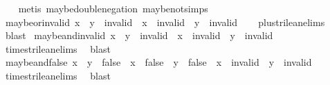 \begin{isabellebody}
%
\isadelimproof
\ \ %
\endisadelimproof
%
\isatagproof
{}\isamarkupfalse%
\ {\isacharparenleft}metis\ maybe{\isacharunderscore}double{\isacharunderscore}negation\ maybe{\isacharunderscore}not{\isachardot}simps{\isacharparenleft}{}{\isacharparenright}{\isacharparenright}%
\endisatagproof
{\isafoldproof}%
%
\isadelimproof
\isanewline
%
\endisadelimproof
\isanewline
{}\isamarkupfalse%
\ maybe{\isacharunderscore}or{\isacharunderscore}invalid{\isacharcolon}\ {\isachardoublequoteopen}{\isacharparenleft}x\ {\isasymor}\isactrlsub {\isacharquery}\ y\ {\isacharequal}\ invalid{\isacharparenright}\ {\isacharequal}\ {\isacharparenleft}x\ {\isacharequal}\ invalid\ {\isasymor}\ y\ {\isacharequal}\ invalid{\isacharparenright}{\isachardoublequoteclose}\isanewline
%
\isadelimproof
\ \ %
\endisadelimproof
%
\isatagproof
{}\isamarkupfalse%
\ plus{\isacharunderscore}trilean{\isachardot}elims\ \isamarkupfalse%
\ blast%
\endisatagproof
{\isafoldproof}%
%
\isadelimproof
\isanewline
%
\endisadelimproof
\isanewline
{}\isamarkupfalse%
\ maybe{\isacharunderscore}and{\isacharunderscore}invalid{\isacharcolon}\ {\isachardoublequoteopen}{\isacharparenleft}x\ {\isasymand}\isactrlsub {\isacharquery}\ y\ {\isacharequal}\ invalid{\isacharparenright}\ {\isacharequal}\ {\isacharparenleft}x\ {\isacharequal}\ invalid\ {\isasymor}\ y\ {\isacharequal}\ invalid{\isacharparenright}{\isachardoublequoteclose}\isanewline
%
\isadelimproof
\ \ %
\endisadelimproof
%
\isatagproof
{}\isamarkupfalse%
\ times{\isacharunderscore}trilean{\isachardot}elims\ \isamarkupfalse%
\ blast%
\endisatagproof
{\isafoldproof}%
%
\isadelimproof
\isanewline
%
\endisadelimproof
\isanewline
{}\isamarkupfalse%
\ maybe{\isacharunderscore}and{\isacharunderscore}false{\isacharcolon}\ {\isachardoublequoteopen}{\isacharparenleft}x\ {\isasymand}\isactrlsub {\isacharquery}\ y\ {\isacharequal}\ false{\isacharparenright}\ {\isacharequal}\ {\isacharparenleft}{\isacharparenleft}x\ {\isacharequal}\ false\ {\isasymor}\ y\ {\isacharequal}\ false{\isacharparenright}\ {\isasymand}\ x\ {\isasymnoteq}\ invalid\ {\isasymand}\ y\ {\isasymnoteq}\ invalid{\isacharparenright}{\isachardoublequoteclose}\isanewline
%
\isadelimproof
\ \ %
\endisadelimproof
%
\isatagproof
{}\isamarkupfalse%
\ times{\isacharunderscore}trilean{\isachardot}elims\ \isamarkupfalse%
\ blast%
\endisatagproof
{\isafoldproof}%
%
\isadelimproof
\isanewline
%
\endisadelimproof
\isanewline
{}\isamarkupfalse%

\end{isabellebody}
